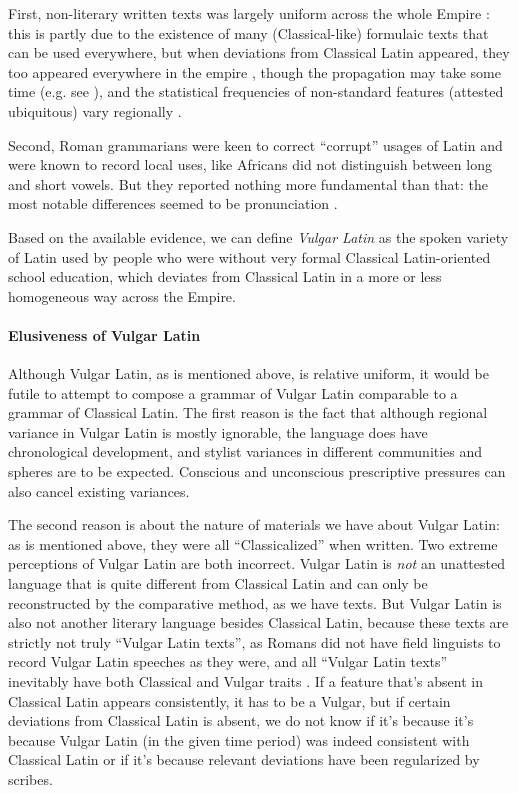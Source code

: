 \documentclass[a4paper, oneside, 12pt]{report}
\newcommand*{\citepage}[1]{p.~{#1}}
\newcommand*{\citepages}[1]{pp.~{#1}}
\newcommand*{\term}[1]{\emph{#1}}
\begin{document}
First, non-literary written texts was largely uniform across the whole Empire
\citep[\citepage{117}]{herman2010vulgar}:
this is partly due to the existence of 
many (Classical-like) formulaic texts that can be used everywhere,
but when deviations from Classical Latin appeared,
they too appeared everywhere in the empire
\citep[\citepage{235}]{clackson2011blackwell},
though the propagation may take some time
(e.g. see ),
and the statistical frequencies of non-standard features (attested ubiquitous) vary regionally
\citep[\citepage{118}]{herman2010vulgar}.

Second, Roman grammarians were keen to correct ``corrupt'' usages of Latin 
and were known to record local uses, 
like Africans did not distinguish between long and short vowels.
But they reported nothing more fundamental than that:
the most notable differences seemed to be pronunciation
\citep[\citepage{118}]{herman2010vulgar}.

Based on the available evidence,
we can define \term{Vulgar Latin} as the spoken variety of Latin
used by people who were without very formal Classical Latin-oriented school education,
which deviates from Classical Latin in a more or less homogeneous way across the Empire.

\paragraph*{Elusiveness of Vulgar Latin}\label{sec:introduction.history.sub-elite.elusive}
Although Vulgar Latin, as is mentioned above, is relative uniform,
it would be futile to attempt to compose a grammar of Vulgar Latin comparable
to a grammar of Classical Latin.
The first reason is the fact that
although regional variance in Vulgar Latin is mostly ignorable,
the language does have chronological development, 
and stylist variances in different communities and spheres are to be expected.
Conscious and unconscious prescriptive pressures can also cancel existing variances. 

The second reason is about the nature of materials we have about Vulgar Latin:
as is mentioned above, they were all ``Classicalized'' when written.
Two extreme perceptions of Vulgar Latin are both incorrect.
Vulgar Latin is \emph{not} an unattested language
that is quite different from Classical Latin and can only be reconstructed by the comparative method,
as we have texts.
But Vulgar Latin is also not another literary language besides Classical Latin, 
because these texts are strictly not truly ``Vulgar Latin texts'',
as Romans did not have field linguists to record Vulgar Latin speeches as they were,
and all ``Vulgar Latin texts'' inevitably have both Classical and Vulgar traits
\citep[\citepages{8,26}]{herman2010vulgar}.
If a feature that's absent in Classical Latin appears consistently,
it has to be a Vulgar,
but if certain deviations from Classical Latin is absent,
we do not know if it's because it's because Vulgar Latin (in the given time period)
was indeed consistent with Classical Latin
or if it's because relevant deviations have been regularized by scribes.
\end{document}
